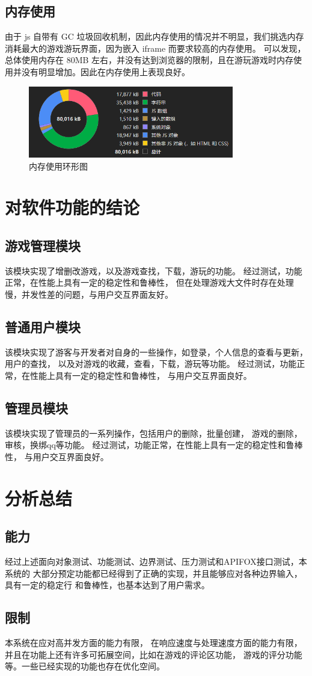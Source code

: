 \documentclass[12pt]{ctexart} %
\begin{document}
\subsection{内存使用}
由于 js 自带有 GC 垃圾回收机制，因此内存使用的情况并不明显，我们挑选内存消耗最大的游戏游玩界面，因为嵌入 iframe 而要求较高的内存使用。
可以发现，总体使用内存在 80MB 左右，并没有达到浏览器的限制，且在游玩游戏时内存使用并没有明显增加。因此在内存使用上表现良好。
\begin{figure}[H]
  \centering
  \includegraphics[width=0.8\textwidth]{front-page4.png}
  \caption{内存使用环形图}
\end{figure}

\section{对软件功能的结论}

\subsection{游戏管理模块}
该模块实现了增删改游戏，以及游戏查找，下载，游玩的功能。 
经过测试，功能正常，在性能上具有一定的稳定性和鲁棒性，
但在处理游戏大文件时存在处理慢，并发性差的问题，与用户交互界面友好。
\subsection{普通用户模块}
该模块实现了游客与开发者对自身的一些操作，如登录，个人信息的查看与更新，用户的查找，
以及对游戏的收藏，查看，下载，游玩等功能。
经过测试，功能正常，在性能上具有一定的稳定性和鲁棒性，
与用户交互界面良好。
\subsection{管理员模块}
该模块实现了管理员的一系列操作，包括用户的删除，批量创建，
游戏的删除，审核，换绑qq等功能。
经过测试，功能正常，在性能上具有一定的稳定性和鲁棒性，
与用户交互界面良好。
\section{分析总结}
\subsection{能力}
经过上述面向对象测试、功能测试、边界测试、压力测试和APIFOX接口测试，本系统的
大部分预定功能都已经得到了正确的实现，并且能够应对各种边界输入，具有一定的稳定行
和鲁棒性，也基本达到了用户需求。
\subsection{限制}
本系统在应对高并发方面的能力有限，
在响应速度与处理速度方面的能力有限，
并且在功能上还有许多可拓展空间，比如在游戏的评论区功能，
游戏的评分功能等。一些已经实现的功能也存在优化空间。
\end{document}
